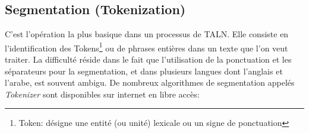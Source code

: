     \subsection{Segmentation (Tokenization)}
    C'est l'opération la plus basique dans un processus de TALN. Elle consiste en l'identification des Tokens\footnote{Token: désigne une entité (ou unité) lexicale ou un signe de ponctuation} ou de phrases entières dans un texte que l'on veut traiter. La difficulté réside dans le fait que l'utilisation de la ponctuation et les séparateurs pour la segmentation, et dans plusieurs langues dont l'anglais et l'arabe, est souvent ambigu.     
    De nombreux algorithmes de segmentation appelés \emph{Tokenizer} sont disponibles sur internet en libre accès:

